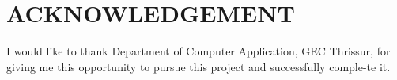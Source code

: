 



\chapter*{\rm \large \bf ACKNOWLEDGEMENT}
\par\hspace{0.5cm}
\begin{justify}

\hspace{0.5cm}I would like to thank  Department of Computer Application, GEC Thrissur, for giving me this opportunity to pursue this project and successfully comple-te it.
\end{justify}

